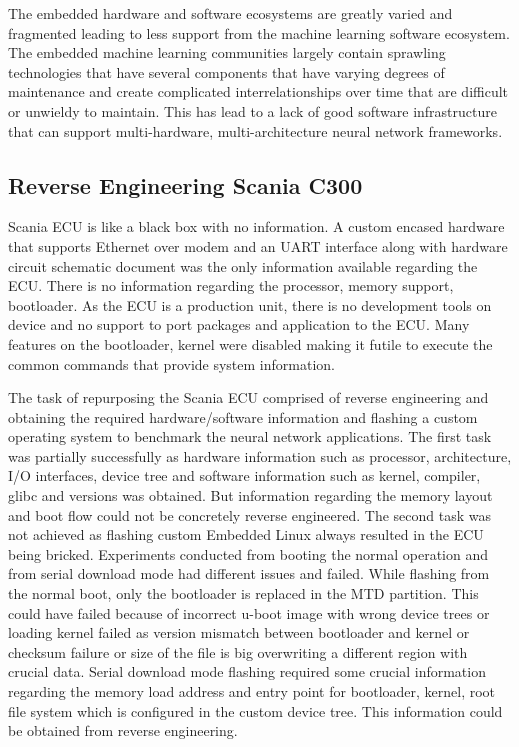 The embedded hardware and software ecosystems are greatly varied and fragmented leading to less support from the machine learning software ecosystem. The embedded machine learning communities largely contain sprawling technologies that have several components that have varying degrees of maintenance and create complicated interrelationships over time that are difficult or unwieldy to maintain. This has lead to a lack of good software infrastructure that can support multi-hardware, multi-architecture neural network frameworks.

\subsection{Reverse Engineering Scania C300}

Scania ECU is like a black box with no information. A custom encased hardware that supports Ethernet over modem and an UART interface along with hardware circuit schematic document was the only information available regarding the ECU. There is no information regarding the processor,  memory support, bootloader. As the ECU is a production unit, there is no development tools on device and no support to port packages and application to the ECU. Many features on the bootloader, kernel were disabled making it futile to execute the common commands that provide system information.

The task of repurposing the Scania ECU comprised of reverse engineering and obtaining the required hardware/software information and flashing a custom operating system to benchmark the neural network applications. The first task was partially successfully as hardware information such as processor, architecture, I/O interfaces, device tree and software information such as kernel, compiler, glibc and versions was obtained. But information regarding the memory layout and boot flow could not be concretely reverse engineered. The second task was not achieved as flashing custom Embedded Linux always resulted in the ECU being bricked. Experiments conducted from booting the normal operation and from serial download mode had different issues and failed. While flashing from the normal boot, only the bootloader is replaced in the MTD partition. This could have failed because of incorrect u-boot image with wrong device trees or loading kernel failed as version mismatch between bootloader and kernel or checksum failure or size of the file is big overwriting a different region with crucial data. Serial download mode flashing required some crucial information regarding the memory load address and entry point for bootloader, kernel, root file system which is configured in the custom device tree. This information could be obtained from reverse engineering.

